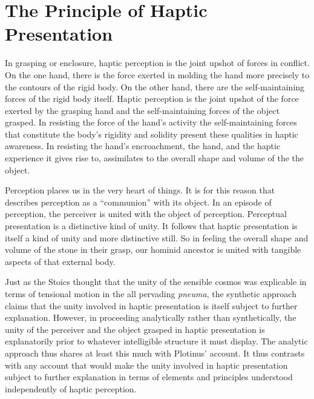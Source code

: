 

\section{The Principle of Haptic Presentation} %
\label{sec:sympathy_as_the_principle_of_haptic_presentation}

In grasping or enclosure, haptic perception is the joint upshot of forces in conflict. On the one hand, there is the force exerted in molding the hand more precisely to the contours of the rigid body. On the other hand, there are the self-maintaining forces of the rigid body itself. Haptic perception is the joint upshot of the force exerted by the grasping hand and the self-maintaining forces of the object grasped. In resisting the force of the hand's activity the self-maintaining forces that constitute the body's rigidity and solidity present these qualities in haptic awareness. In resisting the hand's encroachment, the hand, and the haptic experience it gives rise to, assimilates to the overall shape and volume of the the object.

Perception places us in the very heart of things. It is for this reason that \citet{Ardley:1958aa} describes perception as a ``communion'' with its object. In an episode of perception, the perceiver is united with the object of perception. Perceptual presentation is a distinctive kind of unity. It follows that haptic presentation is itself a kind of unity and more distinctive still. So in feeling the overall shape and volume of the stone in their grasp, our hominid ancestor is united with tangible aspects of that external body.

Just as the Stoics thought that the unity of the sensible cosmos was explicable in terms of tensional motion in the all pervading \emph{pneuma}, the synthetic approach claims that the unity involved in haptic presentation is itself subject to further explanation. However, in proceeding analytically rather than synthetically, the unity of the perceiver and the object grasped in haptic presentation is explanatorily prior to whatever intelligible structure it must display. The analytic approach thus shares at least this much with Plotinus' account. It thus contrasts with any account that would make the unity involved in haptic presentation subject to further explanation in terms of elements and principles understood independently of haptic perception. 

